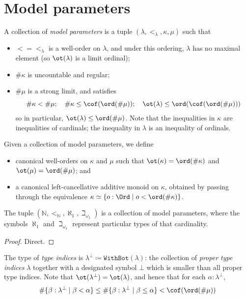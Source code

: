 \section{Model parameters}
\begin{definition}
  \label{def:Params}
  \leanok
  A collection of \emph{model parameters} is a tuple \( (\lambda, {<_\lambda}, \kappa, \mu) \) such that
  \begin{itemize}
    \item \( {<} = {<_\lambda} \) is a well-order on \( \lambda \), and under this ordering, \( \lambda \) has no maximal element (so \( \ot(\lambda) \) is a limit ordinal);
    \item \( \#\kappa \) is uncountable and regular;
    \item \( \#\mu \) is a strong limit, and satisfies
    \[ \#\kappa < \#\mu;\quad \#\kappa \leq \cof(\ord(\#\mu));\quad \ot(\lambda) \leq \ord(\cof(\ord(\#\mu))) \]
    so in particular, \( \ot(\lambda) \leq \ord(\#\mu) \).
    Note that the inequalities in \( \kappa \) are inequalities of cardinals; the inequality in \( \lambda \) is an inequality of ordinals.
  \end{itemize}
  Given a collection of model parameters, we define
  \begin{itemize}
    \item canonical well-orders on \( \kappa \) and \( \mu \) such that \( \ot(\kappa) = \ord(\#\kappa) \) and \( \ot(\mu) = \ord(\#\mu) \); and
    \item a canonical left-cancellative additive monoid on \( \kappa \), obtained by passing through the equivalence \( \kappa \simeq \{ o : \Ord \mid o < \ord(\#\kappa) \} \).
  \end{itemize}
\end{definition}
\begin{proposition}
  \label{prop:Params.minimal}
  \leanok
  The tuple \( (\mathbb N, {<_{\mathbb N}}, \aleph_1, \beth_{\omega_1}) \) is a collection of model parameters, where the symbols \( \aleph_1 \) and \( \beth_{\omega_1} \) represent particular types of that cardinality.
\end{proposition}
\begin{proof}
  \leanok
  Direct.
\end{proof}
\begin{definition}
  \label{def:TypeIndex}
  \leanok
  The type of \emph{type indices} is \( \lambda^\bot \coloneq \texttt{WithBot}(\lambda) \): the collection of \emph{proper type indices} \( \lambda \) together with a designated symbol \( \bot \) which is smaller than all proper type indices.
  Note that \( \ot(\lambda^\bot) = \ot(\lambda) \), and hence that for each \( \alpha : \lambda^\bot \),
  \[ \#\{ \beta : \lambda^\bot \mid \beta < \alpha \} \leq \#\{ \beta : \lambda^\bot \mid \beta \leq \alpha \} < \cof(\ord(\#\mu)) \]
\end{definition}
